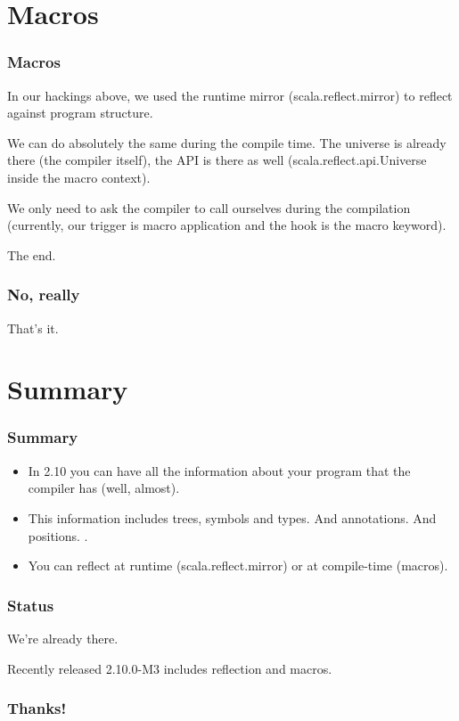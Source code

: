 \documentclass[hyperref={bookmarks=false}]{beamer}
\begin{document}
\section{Macros}

\begin{frame}[fragile]
\frametitle{Macros}

In our hackings above, we used the runtime mirror (scala.reflect.mirror) to reflect against program structure.

We can do absolutely the same during the compile time.
The universe is already there (the compiler itself), the API is there as well
(scala.reflect.api.Universe inside the macro context).

We only need to ask the compiler to call ourselves during the compilation
(currently, our trigger is macro application and the hook is the macro keyword).

The end.

\end{frame}

\begin{frame}[fragile]
\frametitle{No, really}

That's it.

\end{frame}

\section{Summary}

\begin{frame}[fragile]
\frametitle{Summary}

\begin{itemize}
\item In 2.10 you can have all the information about your program that the compiler has (well, almost).
\item This information includes trees, symbols and types. And annotations. And positions.
.
\item You can reflect at runtime (scala.reflect.mirror) or at compile-time (macros).
\end{itemize}
\end{frame}

\begin{frame}[fragile]
\frametitle{Status}

We're already there.

Recently released 2.10.0-M3 includes reflection and macros.

\end{frame}


\begin{frame}[fragile]
\frametitle{Thanks!}

\centering
{}

\end{frame}
\end{document}
